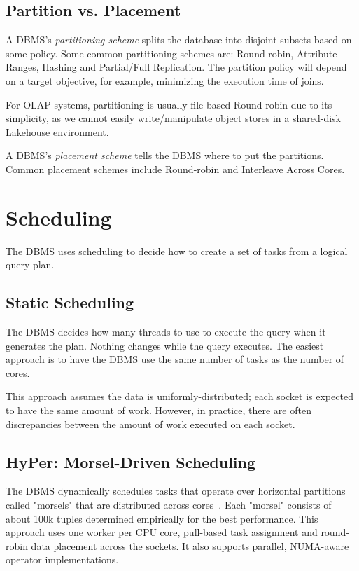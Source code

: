 \documentclass[11pt]{article}
\begin{document}
\subsection*{Partition vs. Placement}
A DBMS's \textit{partitioning scheme} splits the database into disjoint subsets based on some 
policy. Some common partitioning schemes are: Round-robin, Attribute Ranges, Hashing and 
Partial/Full Replication. The partition policy will depend on a target objective, for example, minimizing 
the execution time of joins.

For OLAP systems, partitioning is usually file-based Round-robin due to its simplicity, as we cannot 
easily write/manipulate object stores in a shared-disk Lakehouse environment.

A DBMS's \textit{placement scheme} tells the DBMS where to put the partitions. Common 
placement schemes include Round-robin and Interleave Across Cores.  

\section{Scheduling}
The DBMS uses scheduling to decide how to create a set of tasks from a logical query plan.

\subsection*{Static Scheduling}
The DBMS decides how many threads to use to execute the query when it generates the plan. 
Nothing changes while the query executes. The easiest approach is to have the DBMS use the same 
number of tasks as the number of cores.

This approach assumes the data is uniformly-distributed; each socket is expected to have the 
same amount of work. However, in practice, there are often discrepancies between the amount of work 
executed on each socket.

\subsection*{HyPer: Morsel-Driven Scheduling}
The DBMS dynamically schedules tasks that operate over horizontal partitions called "morsels" that 
are distributed across cores~\cite{Leis2014}. Each "morsel" consists of about 100k tuples determined 
empirically for the best performance. This approach uses one worker per CPU core, pull-based task 
assignment and round-robin data placement across the sockets. It also supports parallel, 
NUMA-aware operator implementations.
\end{document}
